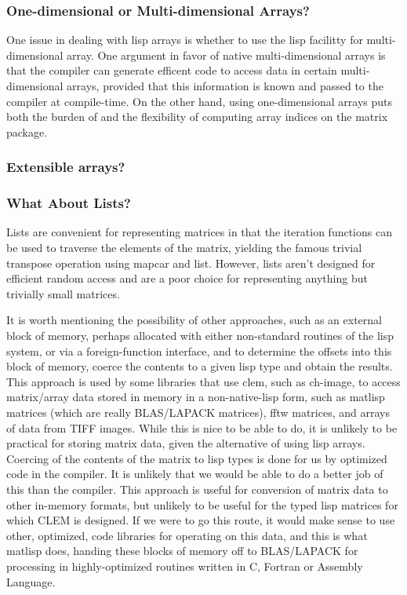 \documentclass[10pt]{article}
\begin{document}
\baselineskip12pt
\subsubsection{One-dimensional or Multi-dimensional Arrays?}
\baselineskip14pt
One issue in dealing with lisp arrays is whether to use
     the lisp facilitty for multi-dimensional array. One argument
     in favor of native multi-dimensional arrays is that the
     compiler can generate efficent code to access data in
     certain multi-dimensional arrays, provided that this
     information is known and passed to the compiler at
     compile-time. On the other hand, using one-dimensional
     arrays puts both the burden of and the flexibility of
     computing array indices on the matrix package.

\baselineskip12pt
\subsubsection{Extensible arrays?}
\baselineskip14pt
\baselineskip12pt
\subsubsection{What About Lists?}
\baselineskip14pt
Lists are convenient for representing matrices in that
 the iteration functions can be used to traverse the elements of
 the matrix, yielding the famous trivial transpose operation
 using mapcar and list. However, lists aren't designed for
 efficient random access and are a poor choice for representing
 anything but trivially small matrices.

It is worth mentioning the possibility of other approaches,
 such as an external block of memory, perhaps allocated with either
 non-standard routines of the lisp system, or via a foreign-function
 interface, and to determine the offsets into this block of memory,
 coerce the contents to a given lisp type and obtain the results. This
 approach is used by some libraries that use clem, such as ch-image,
 to access matrix/array data stored in memory in a non-native-lisp
 form, such as matlisp matrices (which are really BLAS/LAPACK
 matrices), fftw matrices, and arrays of data from TIFF images. While
 this is nice to be able to do, it is unlikely to be practical for
 storing matrix data, given the alternative of using lisp
 arrays. Coercing of the contents of the matrix to lisp types is
 done for us by optimized code in the compiler. It is unlikely that we
 would be able to do a better job of this than the compiler. This
 approach is useful for conversion of matrix data to other in-memory
 formats, but unlikely to be useful for the typed lisp matrices for
 which CLEM is designed. If we were to go this route, it would make
 sense to use other, optimized, code libraries for operating on this
 data, and this is what matlisp does, handing these blocks of memory
 off to BLAS/LAPACK for processing in highly-optimized routines
 written in C, Fortran or Assembly Language. 
\end{document}
